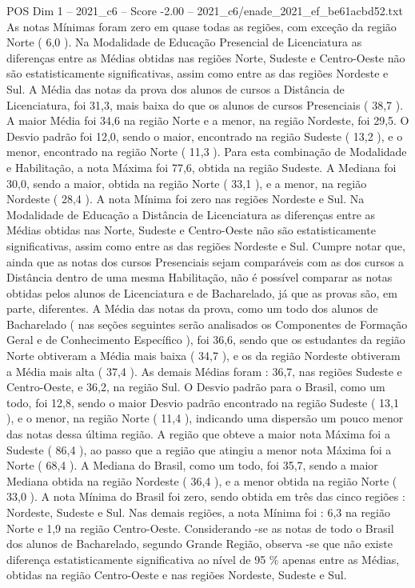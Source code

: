 \begin{textsample}{POS Dim 1 – 2021\_c6 – Score -2.00 – 2021\_c6/enade\_2021\_ef\_be61acbd52.txt}
As notas Mínimas foram zero em quase todas as regiões, com exceção da região Norte ( 6,0 ).
Na Modalidade de Educação Presencial de Licenciatura as diferenças entre as Médias obtidas nas regiões Norte, Sudeste e Centro-Oeste não são estatisticamente significativas, assim como entre as das regiões Nordeste e Sul.
A Média das notas da prova dos alunos de cursos a Distância de Licenciatura, foi 31,3, mais baixa do que os alunos de cursos Presenciais ( 38,7 ).
A maior Média foi 34,6 na região Norte e a menor, na região Nordeste, foi 29,5.
O Desvio padrão foi 12,0, sendo o maior, encontrado na região Sudeste ( 13,2 ), e o menor, encontrado na região Norte ( 11,3 ).
Para esta combinação de Modalidade e Habilitação, a nota Máxima foi 77,6, obtida na região Sudeste.
A Mediana foi 30,0, sendo a maior, obtida na região Norte ( 33,1 ), e a menor, na região Nordeste ( 28,4 ).
A nota Mínima foi zero nas regiões Nordeste e Sul.
Na Modalidade de Educação a Distância de Licenciatura as diferenças entre as Médias obtidas nas Norte, Sudeste e Centro-Oeste não são estatisticamente significativas, assim como entre as das regiões Nordeste e Sul.
Cumpre notar que, ainda que as notas dos cursos Presenciais sejam comparáveis com as dos cursos a Distância dentro de uma mesma Habilitação, não é possível comparar as notas obtidas pelos alunos de Licenciatura e de Bacharelado, já que as provas são, em parte, diferentes.
A Média das notas da prova, como um todo dos alunos de Bacharelado ( nas seções seguintes serão analisados os Componentes de Formação Geral e de Conhecimento Específico ), foi 36,6, sendo que os estudantes da região Norte obtiveram a Média mais baixa ( 34,7 ), e os da região Nordeste obtiveram a Média mais alta ( 37,4 ).
As demais Médias foram : 36,7, nas regiões Sudeste e Centro-Oeste, e 36,2, na região Sul.
O Desvio padrão para o Brasil, como um todo, foi 12,8, sendo o maior Desvio padrão encontrado na região Sudeste ( 13,1 ), e o menor, na região Norte ( 11,4 ), indicando uma dispersão um pouco menor das notas dessa última região.
A região que obteve a maior nota Máxima foi a Sudeste ( 86,4 ), ao passo que a região que atingiu a menor nota Máxima foi a Norte ( 68,4 ).
A Mediana do Brasil, como um todo, foi 35,7, sendo a maior Mediana obtida na região Nordeste ( 36,4 ), e a menor obtida na região Norte ( 33,0 ).
A nota Mínima do Brasil foi zero, sendo obtida em três das cinco regiões : Nordeste, Sudeste e Sul.
Nas demais regiões, a nota Mínima foi : 6,3 na região Norte e 1,9 na região Centro-Oeste.
Considerando -se as notas de todo o Brasil dos alunos de Bacharelado, segundo Grande Região, observa -se que não existe diferença estatisticamente significativa ao nível de 95 \% apenas entre as Médias, obtidas na região Centro-Oeste e nas regiões Nordeste, Sudeste e Sul.

\end{textsample}
